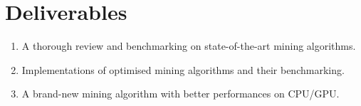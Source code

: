 \documentclass[11pt]{article}
\begin{document}
\section{Deliverables}

\begin{enumerate}
\item A thorough review and benchmarking on state-of-the-art mining algorithms.
\item Implementations of optimised mining algorithms and their benchmarking.
\item A brand-new mining algorithm with better performances on CPU/GPU.
\end{enumerate}

\newpage



\end{document}
